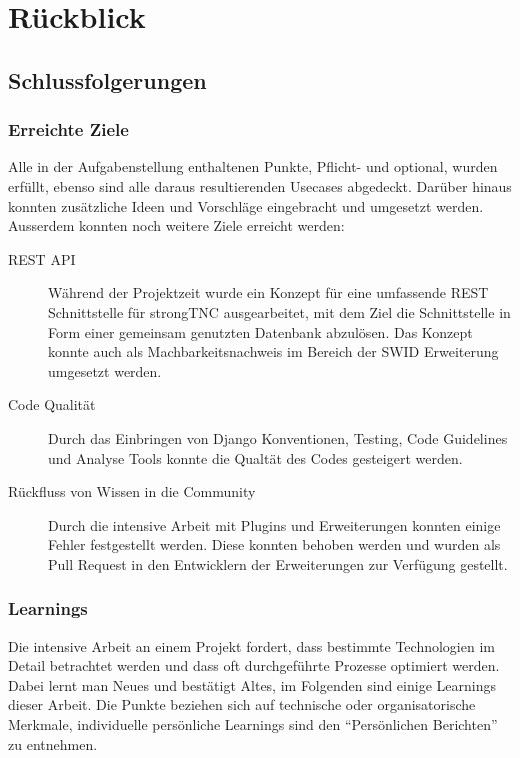 \chapter{Rückblick}


\section{Schlussfolgerungen}

\subsection{Erreichte Ziele}
Alle in der Aufgabenstellung enthaltenen Punkte, Pflicht- und optional,  wurden
erfüllt, ebenso sind alle daraus resultierenden Usecases abgedeckt. Darüber
hinaus konnten zusätzliche Ideen und Vorschläge eingebracht und umgesetzt
werden.\\
Ausserdem konnten noch weitere Ziele erreicht werden:                 
\begin{description}                  
                                  
	\item[REST API] Während der Projektzeit wurde ein Konzept für eine umfassende
	REST Schnittstelle für strongTNC ausgearbeitet, mit dem Ziel die Schnittstelle
	in Form einer gemeinsam genutzten Datenbank abzulösen. Das Konzept konnte auch
	als Machbarkeitsnachweis im Bereich der SWID Erweiterung umgesetzt werden.
	
	\item[Code Qualität] Durch das Einbringen von Django Konventionen, Testing,
	Code Guidelines und Analyse Tools konnte die Qualtät des Codes gesteigert
	werden.
	
	\item[Rückfluss von Wissen in die Community] Durch die intensive Arbeit mit
	Plugins und Erweiterungen konnten einige Fehler festgestellt werden. Diese
	konnten behoben werden und wurden als Pull Request in den Entwicklern der
	Erweiterungen zur Verfügung gestellt.
	
\end{description}


\subsection{Learnings}
Die intensive Arbeit an einem Projekt fordert, dass bestimmte Technologien im
Detail betrachtet werden und dass oft durchgeführte Prozesse optimiert werden.
Dabei lernt man Neues und bestätigt Altes, im Folgenden sind einige Learnings
dieser Arbeit. Die Punkte beziehen sich auf technische oder organisatorische
Merkmale, individuelle persönliche Learnings sind den \enquote{Persönlichen
Berichten} zu entnehmen.

